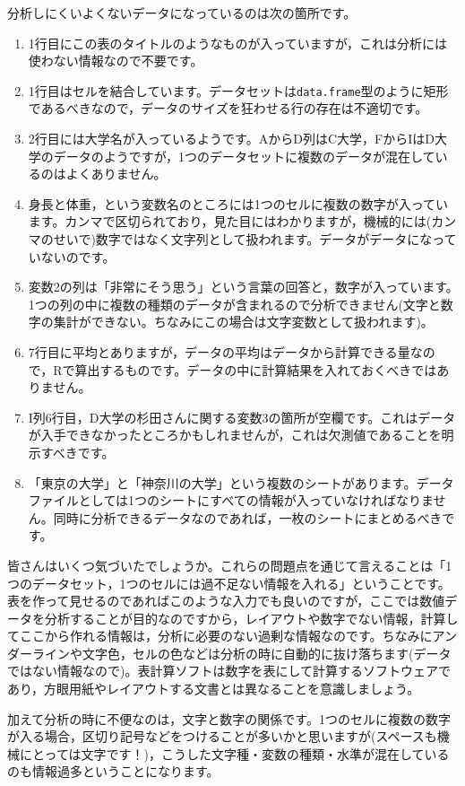 \documentclass{ltjsbook}
\begin{document}
分析しにくいよくないデータになっているのは次の箇所です。
\begin{enumerate}
	\item 1行目にこの表のタイトルのようなものが入っていますが，これは分析には使わない情報なので不要です。
	\item 1行目はセルを結合しています。データセットは\texttt{data.frame}型のように矩形であるべきなので，データのサイズを狂わせる行の存在は不適切です。
	\item 2行目には大学名が入っているようです。AからD列はC大学，FからIはD大学のデータのようですが，1つのデータセットに複数のデータが混在しているのはよくありません。
	\item 身長と体重，という変数名のところには1つのセルに複数の数字が入っています。カンマで区切られており，見た目にはわかりますが，機械的には(カンマのせいで)数字ではなく文字列として扱われます。データがデータになっていないのです。
	\item 変数2の列は「非常にそう思う」という言葉の回答と，数字が入っています。1つの列の中に複数の種類のデータが含まれるので分析できません(文字と数字の集計ができない。ちなみにこの場合は文字変数として扱われます)。
	\item 7行目に平均とありますが，データの平均はデータから計算できる量なので，Rで算出するものです。データの中に計算結果を入れておくべきではありません。
	\item I列6行目，D大学の杉田さんに関する変数3の箇所が空欄です。これはデータが入手できなかったところかもしれませんが，これは欠測値であることを明示すべきです。
	\item 「東京の大学」と「神奈川の大学」という複数のシートがあります。データファイルとしては1つのシートにすべての情報が入っていなければなりません。同時に分析できるデータなのであれば，一枚のシートにまとめるべきです。
\end{enumerate}
皆さんはいくつ気づいたでしょうか。これらの問題点を通じて言えることは「1つのデータセット，1つのセルには過不足ない情報を入れる」ということです。表を作って見せるのであればこのような入力でも良いのですが，ここでは数値データを分析することが目的なのですから，レイアウトや数字でない情報，計算してここから作れる情報は，分析に必要のない過剰な情報なのです。ちなみにアンダーラインや文字色，セルの色などは分析の時に自動的に抜け落ちます(データではない情報なので)。表計算ソフトは数字を表にして計算するソフトウェアであり，方眼用紙やレイアウトする文書とは異なることを意識しましょう。

加えて分析の時に不便なのは，文字と数字の関係です。1つのセルに複数の数字が入る場合，区切り記号などをつけることが多いかと思いますが(スペースも機械にとっては文字です！)，こうした文字種・変数の種類・水準が混在しているのも情報過多ということになります。
\end{document}
